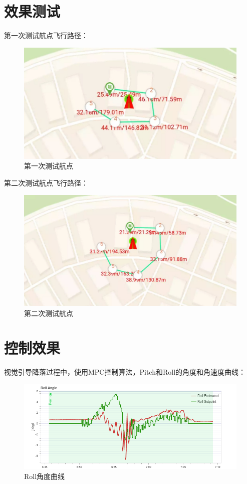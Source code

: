 \section{效果测试}

第一次测试航点飞行路径：
\begin{figure}[H]
    \centering
    \includegraphics[width=0.8\linewidth]{./Figure/Waypoint_Flight_Test1.jpg}
    \caption{第一次测试航点}\label{Fig:append_img6}
\end{figure}

第二次测试航点飞行路径：
\begin{figure}[H]
    \centering
    \includegraphics[width=0.8\linewidth]{./Figure/Waypoint_Flight_Test2.jpg}
    \caption{第二次测试航点}\label{Fig:append_img7}
\end{figure}

\section{控制效果}

视觉引导降落过程中，使用MPC控制算法，Pitch和Roll的角度和角速度曲线：
\begin{figure}[H]
    \centering
    \includegraphics[width=0.8\linewidth]{./Figure/Roll_Angle_Plot.png}
    \caption{Roll角度曲线}\label{Fig:append_img8}
\end{figure}

